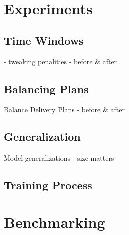 \section{Experiments}
\subsection{Time Windows}
- tweaking penalities
- before & after

\subsection{Balancing Plans}
Balance Delivery Plans
- before & after

\subsection{Generalization}
Model generalizations
- size matters

\subsection{Training Process}

\section{Benchmarking}